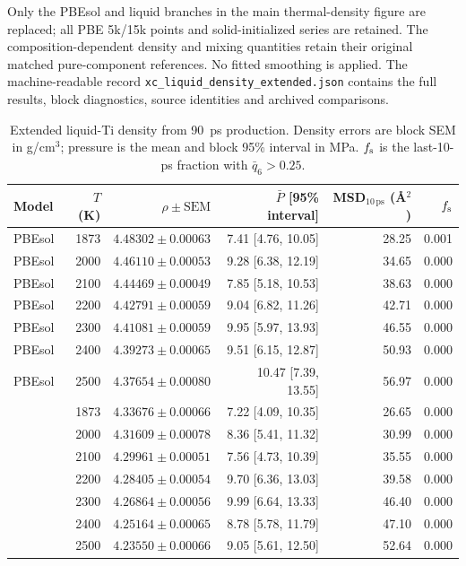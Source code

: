Only the PBEsol and \rscan{} liquid branches in the main thermal-density figure are replaced; all PBE 5k/15k points and solid-initialized series are retained. The composition-dependent density and mixing quantities retain their original matched pure-component references. No fitted smoothing is applied. The machine-readable record \texttt{xc\_liquid\_density\_extended.json} contains the full results, block diagnostics, source identities and archived comparisons.

\begin{table}[htbp]
\centering\small
\setlength{\tabcolsep}{4pt}
\caption{Extended liquid-Ti density from 90~ps production. Density errors are block SEM in g/cm$^3$; pressure is the mean and block 95\% interval in MPa. $f_{\rm s}$ is the last-10-ps fraction with $\bar q_6>0.25$.}
\label{tab:xc_liquid_density_extended}
\begin{tabular}{lrrrrr}
\toprule
Model & $T$ (K) & $\rho\pm\mathrm{SEM}$ & $\bar P$ [95\% interval] & MSD$_{10\,\mathrm{ps}}$ (\AA$^2$) & $f_{\rm s}$\\
\midrule
PBEsol & 1873 & $4.48302\pm0.00063$ & 7.41 [4.76, 10.05] & 28.25 & 0.001\\
PBEsol & 2000 & $4.46110\pm0.00053$ & 9.28 [6.38, 12.19] & 34.65 & 0.000\\
PBEsol & 2100 & $4.44469\pm0.00049$ & 7.85 [5.18, 10.53] & 38.63 & 0.000\\
PBEsol & 2200 & $4.42791\pm0.00059$ & 9.04 [6.82, 11.26] & 42.71 & 0.000\\
PBEsol & 2300 & $4.41081\pm0.00059$ & 9.95 [5.97, 13.93] & 46.55 & 0.000\\
PBEsol & 2400 & $4.39273\pm0.00065$ & 9.51 [6.15, 12.87] & 50.93 & 0.000\\
PBEsol & 2500 & $4.37654\pm0.00080$ & 10.47 [7.39, 13.55] & 56.97 & 0.000\\
\midrule
\rscan{} & 1873 & $4.33676\pm0.00066$ & 7.22 [4.09, 10.35] & 26.65 & 0.000\\
\rscan{} & 2000 & $4.31609\pm0.00078$ & 8.36 [5.41, 11.32] & 30.99 & 0.000\\
\rscan{} & 2100 & $4.29961\pm0.00051$ & 7.56 [4.73, 10.39] & 35.55 & 0.000\\
\rscan{} & 2200 & $4.28405\pm0.00054$ & 9.70 [6.36, 13.03] & 39.58 & 0.000\\
\rscan{} & 2300 & $4.26864\pm0.00056$ & 9.99 [6.64, 13.33] & 46.40 & 0.000\\
\rscan{} & 2400 & $4.25164\pm0.00065$ & 8.78 [5.78, 11.79] & 47.10 & 0.000\\
\rscan{} & 2500 & $4.23550\pm0.00066$ & 9.05 [5.61, 12.50] & 52.64 & 0.000\\
\bottomrule
\end{tabular}
\end{table}
